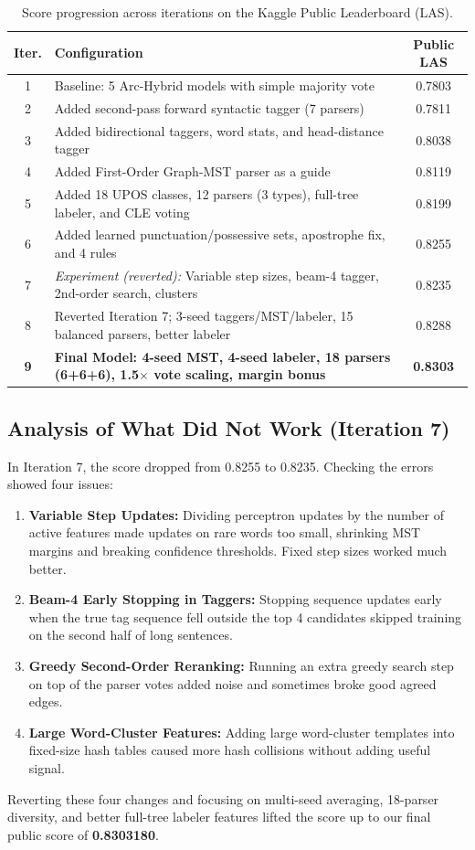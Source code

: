 \documentclass[11pt,a4paper]{article}
\begin{document}
\begin{table}[H]
\centering
\caption{Score progression across iterations on the Kaggle Public Leaderboard (LAS).}
\label{tab:kaggle_progression}
\begin{tabular}{@{}c>{\raggedright\arraybackslash}p{10.8cm}c@{}}
\toprule
\textbf{Iter.} & \textbf{Configuration} & \textbf{Public LAS} \\
\midrule
1 & Baseline: 5 Arc-Hybrid models with simple majority vote & 0.7803 \\
2 & Added second-pass forward syntactic tagger (7 parsers) & 0.7811 \\
3 & Added bidirectional taggers, word stats, and head-distance tagger & 0.8038 \\
4 & Added First-Order Graph-MST parser as a guide & 0.8119 \\
5 & Added 18 UPOS classes, 12 parsers (3 types), full-tree labeler, and CLE voting & 0.8199 \\
6 & Added learned punctuation/possessive sets, apostrophe fix, and 4 rules & 0.8255 \\
7 & \emph{Experiment (reverted):} Variable step sizes, beam-4 tagger, 2nd-order search, clusters & 0.8235 \\
8 & Reverted Iteration 7; 3-seed taggers/MST/labeler, 15 balanced parsers, better labeler & 0.8288 \\
\textbf{9} & \textbf{Final Model: 4-seed MST, 4-seed labeler, 18 parsers (6+6+6), 1.5$\times$ vote scaling, margin bonus} & \textbf{0.8303} \\
\bottomrule
\end{tabular}
\end{table}

\subsection{Analysis of What Did Not Work (Iteration 7)}
In Iteration 7, the score dropped from 0.8255 to 0.8235. Checking the errors showed four issues:
\begin{enumerate}[noitemsep]
    \item \textbf{Variable Step Updates:} Dividing perceptron updates by the number of active features made updates on rare words too small, shrinking MST margins and breaking confidence thresholds. Fixed step sizes worked much better.
    \item \textbf{Beam-4 Early Stopping in Taggers:} Stopping sequence updates early when the true tag sequence fell outside the top 4 candidates skipped training on the second half of long sentences.
    \item \textbf{Greedy Second-Order Reranking:} Running an extra greedy search step on top of the parser votes added noise and sometimes broke good agreed edges.
    \item \textbf{Large Word-Cluster Features:} Adding large word-cluster templates into fixed-size hash tables caused more hash collisions without adding useful signal.
\end{enumerate}
Reverting these four changes and focusing on multi-seed averaging, 18-parser diversity, and better full-tree labeler features lifted the score up to our final public score of \textbf{0.8303180}.
\end{document}
